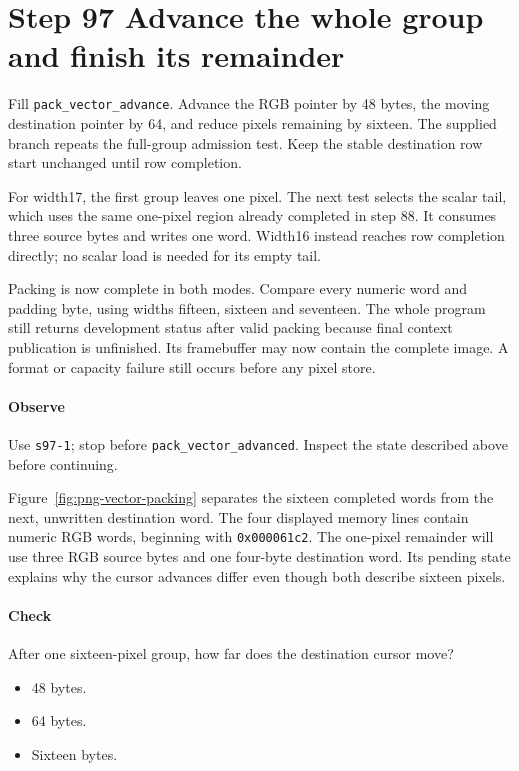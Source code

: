 \section{Step 97 Advance the whole group and finish its remainder}
Fill \texttt{pack\_vector\_advance}. Advance the RGB pointer by 48 bytes, the moving destination pointer by 64, and reduce pixels remaining by sixteen. The supplied branch repeats the full-group admission test. Keep the stable destination row start unchanged until row completion.

For width17, the first group leaves one pixel. The next test selects the scalar tail, which uses the same one-pixel region already completed in step 88. It consumes three source bytes and writes one word. Width16 instead reaches row completion directly; no scalar load is needed for its empty tail.

Packing is now complete in both modes. Compare every numeric word and padding byte, using widths fifteen, sixteen and seventeen. The whole program still returns development status after valid packing because final context publication is unfinished. Its framebuffer may now contain the complete image. A format or capacity failure still occurs before any pixel store.

\paragraph{Observe} Use \texttt{s97-1}; stop before \texttt{pack\_vector\_advanced}. Inspect the state described above before continuing.

Figure~\ref{fig:png-vector-packing} separates the sixteen completed words from
the next, unwritten destination word. The four displayed memory lines contain
numeric RGB words, beginning with \texttt{0x000061c2}. The one-pixel remainder
will use three RGB source bytes and one four-byte destination word. Its pending
state explains why the cursor advances differ even though both describe sixteen
pixels.


\clearpage

\paragraph{Check} After one sixteen-pixel group, how far does the destination cursor move?
\begin{itemize}
  \item[A.] 48 bytes.
  \item[B.] 64 bytes.
  \item[C.] Sixteen bytes.
\end{itemize}

